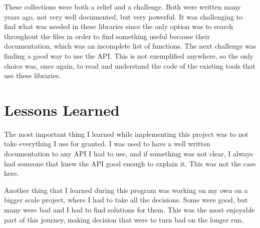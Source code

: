 These collections were both a relief and a challenge. Both were written many years ago, not very well documented, but very powerful. It was challenging to find what was needed in these  libraries since the only option was to search throughout the files in order to find something useful because their documentation, which was an incomplete list of functions. The next challenge was finding a good way to use the API. This is not exemplified anywhere, so the only choice was, once again, to read and understand the code of the existing tools that use these libraries.


\section{Lessons Learned}
\label{sec:less-learned}

The most important thing I learned while implementing this project was to not take everything I use for granted. I was used to have a well written documentation to any API I had to use, and if something was not clear, I always had someone that knew the API good enough to explain it. This was not the case here.

Another thing that I learned during this program was working on my own on a bigger scale project, where I had to take all the decisions. Some were good, but many were bad and I had to find solutions for them. This was the most enjoyable part of this journey, making decision that were to turn bad on the longer run.